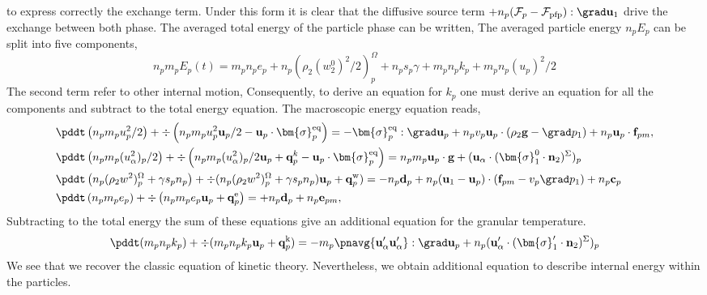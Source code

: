 to express correctly the exchange term. 
Under this form it is clear that the diffusive source term $+ n_p (\mathcal{F}_p - \mathcal{F}_\text{pfp}):\grad \textbf{u}_1$ drive the exchange between both phase. 
The averaged total energy of the particle phase can be written,
The averaged particle energy $n_p E_p$ can be split into five components,
\begin{equation*}
    n_p m_p E_p(t) 
    = m_p n_p e_p 
    + n_p (\rho_2  (w_2^0)^2/2 )_p^\Omega
    + n_p s_p \gamma
    + m_p n_p k_p
    + m_p n_p (u_p)^2/2
\end{equation*}
The second term refer to other internal motion, 
Consequently, to derive an equation for $k_p$ one must derive an equation for all the components and subtract to the total energy equation. 
The macroscopic energy equation reads, 
\begin{align*}
    &\pddt \left(n_p m_p u_p^2/ 2\right)
    + \div \left(n_p
    m_p u_p^2 \textbf{u}_p /2
    - \textbf{u}_p \cdot \bm{\sigma}_p^\text{eq}
    \right)
    = 
    - \bm{\sigma}_p^\text{eq}  :\grad \textbf{u}_p
    +  n_p v_p \textbf{u}_p \cdot (
    \rho_2 \textbf{g}
    - \grad p_1 )
    + n_p \textbf{u}_p \cdot \textbf{f}_{pm},\\
    &\pddt \left(n_p m_p (u_\alpha^2)_p/ 2\right)
    + \div \left(n_p
    m_p (u_\alpha^2)_p/ 2 \textbf{u}_p 
    + \textbf{q}^k_p
    - \textbf{u}_p \cdot \bm{\sigma}_p^\text{eq}
    \right)
    = 
    n_p m_p \textbf{u}_p \cdot
    \textbf{g}
    + 
    (\textbf{u}_\alpha\cdot
    (\bm{\sigma}_1^0 \cdot \textbf{n}_2)^\Sigma)_p\\
    &\pddt \left(n_p (\rho_2 w^2 )_p^\Omega+\gamma s_p n_p\right)
    + \div 
    (n_p (\rho_2 w^2 )_p^\Omega+\gamma s_p n_p)
    \textbf{u}_p 
    +  \textbf{q}_p^\text{w}
    )
    = 
    - n_p \textbf{d}_p
    +  n_p (\textbf{u}_1 -\textbf{u}_p) \cdot  (\textbf{f}_{pm} - v_p \grad p_1)
    + n_p\textbf{c}_p\\
    &\pddt \left(n_p m_p e_p\right)
    + \div \left(n_p
    m_p e_p \textbf{u}_p 
    +  \textbf{q}_p^\text{e}
    \right)
    = 
    + n_p \textbf{d}_p
    + n_p \textbf{e}_{pm},\\
\end{align*}
Subtracting to the total energy the sum of these equations give an additional equation for the granular temperature. 
\begin{equation}
    \pddt(m_p n_pk_p)
    + \div(m_pn_p k_p \textbf{u}_p 
    + \textbf{q}_p^\text{k})
    = 
     -m_p \pnavg{\textbf{u}_\alpha'\textbf{u}_\alpha'} :\grad \textbf{u}_p
     + n_p (\textbf{u}_\alpha' \cdot (\bm{\sigma}_1' \cdot  \textbf{n}_2)^\Sigma)_p
    \\
\end{equation}
We see that we recover the classic equation of kinetic theory. 
Nevertheless, we obtain additional equation to describe internal energy within the particles. 


